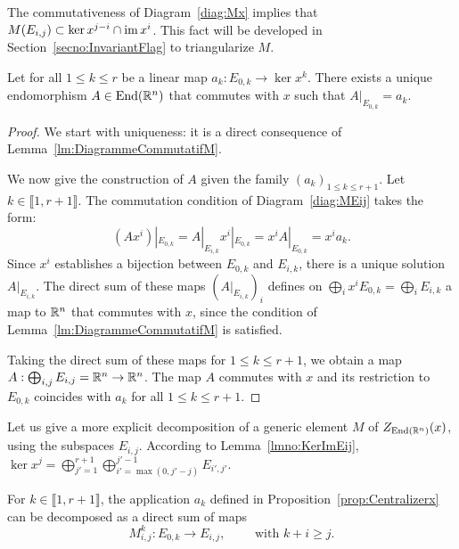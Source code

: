 \documentclass[english]{article}
\begin{document}
\begin{remark}
    The commutativeness of Diagram~\eqref{diag:Mx} implies that $M(E_{i,j}) \subset \ker x^{j-i} \cap \operatorname{im} x^i$. This fact will be developed in Section~\ref{secno:InvariantFlag} to triangularize $M$.
\end{remark}

\begin{proposition}\label{prop:Centralizerx}
    Let for all $1\leqslant k \leqslant r$ be a linear map $a_k : E_{0,k} \to \ker x^k$.
    There exists a unique endomorphism $A\in \operatorname{End}(\mathbb{R}^n)$ that commutes with $x$ such that $A|_{E_{0,k}} = a_k$.
\end{proposition}

\begin{proof}
    We start with uniqueness: it is a direct consequence of Lemma~\ref{lm:DiagrammeCommutatifM}.

    We now give the construction of $A$ given the family $(a_k)_{1\leqslant k \leqslant r+1}$. 
    Let $k\in \llbracket 1, r+1 \rrbracket$.
    The commutation condition of Diagram~\eqref{diag:MEij} takes the form:
	\[
		(A x^i)|_{E_{0,k}}
		= A|_{E_{i,k}} x^i |_{E_{0,k}} 
		= x^i A|_{E_{0,k}} 
		= x^i a_k
	.\] 
%
    Since $x^i$ establishes a bijection between $E_{0,k}$ and $E_{i,k}$, there is a unique solution $A|_{E_{i,k}}$.
    The direct sum of these maps $(A|_{E_{i,k}})_{i}$ defines on $\bigoplus_i x^i E_{0,k} = \bigoplus_i E_{i,k}$ a map to $\mathbb{R}^n$ that commutes with $x$, since the condition of Lemma~\ref{lm:DiagrammeCommutatifM} is satisfied.

    Taking the direct sum of these maps for $1\leqslant k \leqslant r+1$, we obtain a map $A : \bigoplus_{i,j} E_{i,j} = \mathbb{R}^n \to  \mathbb{R}^n$. The map $A$ commutes with $x$ and its restriction to $E_{0,k}$ coincides with $a_k$ for all $1\leqslant k \leqslant r+1$.

\end{proof}

Let us give a more explicit decomposition of a generic element $M$ of $Z_{\operatorname{End}(\mathbb{R}^n)}(x)$, using the subspaces $E_{i,j}$. According to Lemma~\ref{lmno:KerImEij}, 
$\ker x^j
            = \bigoplus_{j'=1}^{r+1}
            \bigoplus_{i'=\max(0, j'-j)}^{j'-1}
                E_{i',j'}$.

For $k\in \llbracket 1, r+1 \rrbracket$, the application $a_k$ defined in Proposition~\ref{prop:Centralizerx} can be decomposed as a direct sum of maps
\[
    M^k_{i,j} : E_{0,k} \to E_ {i,j},
    \qquad
    \text{ with }
    k+i \geqslant j
.\]
\end{document}

